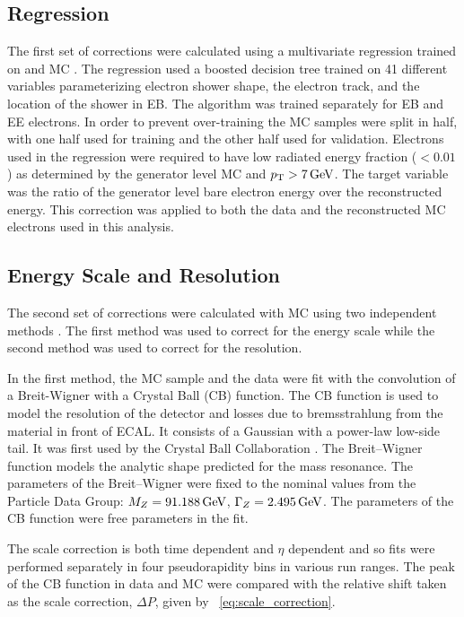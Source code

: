\subsection{Regression}

The first set of corrections were calculated using a multivariate regression
trained on \Ztoee and \higgstoZZ MC \cite{cms_an_2012-327}. The regression used
a boosted decision tree trained on 41 different variables parameterizing
electron shower shape, the electron track, and the location of the shower in
EB. The algorithm was trained separately for EB and EE electrons. In order to
prevent over-training the MC samples were split in half, with one half used for
training and the other half used for validation. Electrons used in the
regression were required to have low radiated energy fraction ($< 0.01$) as
determined by the generator level MC and $p_{\mathrm{T}} > 7 \,\text{Ge\hspace{-.08em}V}$. The target variable
was the ratio of the generator level bare electron energy over the
reconstructed energy. This correction was applied to both the data and the
reconstructed MC electrons used in this analysis.

\subsection{Energy Scale and Resolution}

The second set of corrections were calculated with \Ztoee MC using two
independent methods \cite{cms_an_2013-253}. The first method was used to
correct for the energy scale while the second method was used to correct for
the resolution.

In the first method, the MC sample and the data were fit with the convolution
of a Breit-Wigner with a Crystal Ball (CB) function. The CB function is used to
model the resolution of the detector and losses due to bremsstrahlung from the
material in front of ECAL. It consists of a Gaussian with a power-law low-side
tail. It was first used by the Crystal Ball Collaboration \cite{oreglia_1980}.
The Breit--Wigner function models the analytic shape predicted for the \Z mass
resonance. The parameters of the Breit--Wigner were fixed to the nominal values
from the Particle Data Group: $M_{Z} = 91.188 \,\text{Ge\hspace{-.08em}V}$, $\Gamma_{Z} = 2.495 \,\text{Ge\hspace{-.08em}V}$. The
parameters of the CB function were free parameters in the fit.

The scale correction is both time dependent and $\eta$ dependent and so fits
were performed separately in four pseudorapidity bins in various run ranges.
The peak of the CB function in data and MC were compared with the relative
shift taken as the scale correction, $\Delta P$, given by
\EQ~\ref{eq:scale_correction}.

